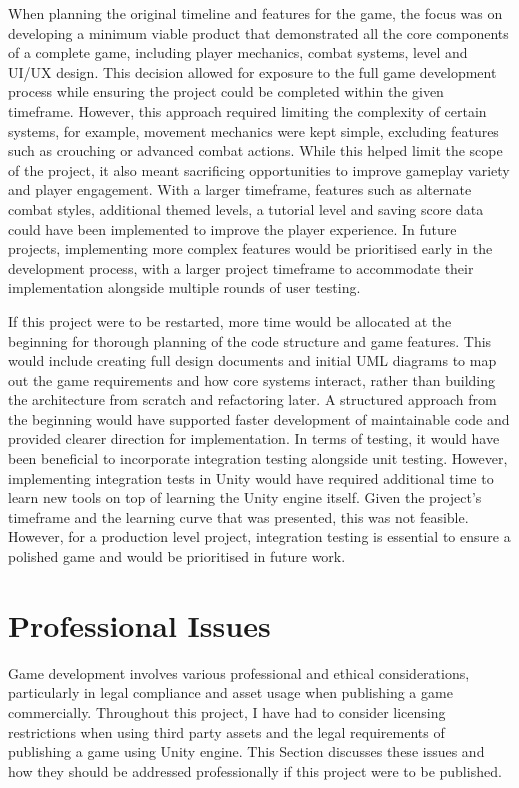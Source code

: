 \documentclass[10pt]{final_report}
\begin{document}
When planning the original timeline and features for the game, the focus was on developing a minimum viable product that demonstrated all the core components of a complete game, including player mechanics, combat systems, level and UI/UX design. This decision allowed for exposure to the full game development process while ensuring the project could be completed within the given timeframe. However, this approach required limiting the complexity of certain systems, for example, movement mechanics were kept simple, excluding features such as crouching or advanced combat actions. While this helped limit the scope of the project, it also meant sacrificing opportunities to improve gameplay variety and player engagement. With a larger timeframe, features such as alternate combat styles, additional themed levels, a tutorial level and saving score data could have been implemented to improve the player experience. In future projects, implementing more complex features would be prioritised early in the development process, with a larger project timeframe to accommodate their implementation alongside multiple rounds of user testing. \newline

If this project were to be restarted, more time would be allocated at the beginning for thorough planning of the code structure and game features. This would include creating full design documents and initial UML diagrams to map out the game requirements and how core systems interact, rather than building the architecture from scratch and refactoring later. A structured approach from the beginning would have supported faster development of maintainable code and provided clearer direction for implementation.\newline
In terms of testing, it would have been beneficial to incorporate integration testing alongside unit testing. However, implementing integration tests in Unity would have required additional time to learn new tools on top of learning the Unity engine itself. Given the project's timeframe and the learning curve that was presented, this was not feasible. However, for a production level project, integration testing is essential to ensure a polished game and would be prioritised in future work.

\chapter{Professional Issues}
Game development involves various professional and ethical considerations, particularly in legal compliance and asset usage when publishing a game commercially. Throughout this project, I have had to consider licensing restrictions when using third party assets and the legal requirements of publishing a game using Unity engine. This Section discusses these issues and how they should be addressed professionally if this project were to be published. \newline
\end{document}
